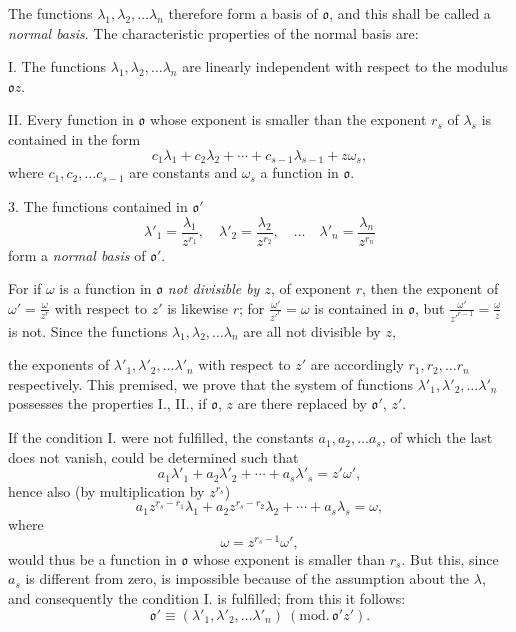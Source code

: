 \documentclass{article}
\begin{document}
The functions $\lambda_{1}, \lambda_{2}, \ldots \lambda_{n}$ therefore form a basis of $\mathfrak{o}$, and this shall be called a \emph{normal basis}. The characteristic properties of the normal basis are:

I. The functions $\lambda_{1}, \lambda_{2}, \ldots \lambda_{n}$ are linearly independent with respect to the modulus $\mathfrak{o}z$.

II. Every function in $\mathfrak{o}$ whose exponent is smaller than the exponent $r_{s}$ of $\lambda_{s}$ is contained in the form
\[ c_{1}\lambda_{1} + c_{2}\lambda_{2} + \cdots + c_{s-1}\lambda_{s-1} + z\omega_{s}, \]
where $c_{1}, c_{2}, \ldots c_{s-1}$ are constants and $\omega_{s}$ a function in $\mathfrak{o}$.

3. The functions contained in $\mathfrak{o}'$
\[ \lambda'_{1} = \frac{\lambda_{1}}{z^{r_{1}}}, \quad \lambda'_{2} = \frac{\lambda_{2}}{z^{r_{2}}}, \quad \ldots \quad \lambda'_{n} = \frac{\lambda_{n}}{z^{r_{n}}} \]
form a \emph{normal basis} of $\mathfrak{o}'$.

For if $\omega$ is a function in $\mathfrak{o}$ \emph{not divisible by $z$}, of exponent $r$, then the exponent of $\omega' = \frac{\omega}{z^{r}}$ with respect to $z'$ is likewise $r$; for $\frac{\omega'}{z'^{r}} = \omega$ is contained in $\mathfrak{o}$, but $\frac{\omega'}{z'^{r-1}} = \frac{\omega}{z}$ is not. Since the functions $\lambda_{1}, \lambda_{2}, \ldots \lambda_{n}$ are all not divisible by $z$,

the exponents of $\lambda'_{1}, \lambda'_{2}, \ldots \lambda'_{n}$ with respect to $z'$ are accordingly $r_{1}, r_{2}, \ldots r_{n}$ respectively. This premised, we prove that the system of functions $\lambda'_{1}, \lambda'_{2}, \ldots \lambda'_{n}$ possesses the properties I., II., if $\mathfrak{o}$, $z$ are there replaced by $\mathfrak{o}'$, $z'$.

If the condition I. were not fulfilled, the constants $a_{1}, a_{2}, \ldots a_{s}$, of which the last does not vanish, could be determined such that
\[ a_{1}\lambda'_{1} + a_{2}\lambda'_{2} + \cdots + a_{s}\lambda'_{s} = z'\omega', \]
hence also (by multiplication by $z^{r_{s}}$)
\[ a_{1}z^{r_{s}-r_{1}}\lambda_{1} + a_{2}z^{r_{s}-r_{2}}\lambda_{2} + \cdots + a_{s}\lambda_{s} = \omega, \]
where
\[ \omega = z^{r_{s}-1}\omega', \]
would thus be a function in $\mathfrak{o}$ whose exponent is smaller than $r_{s}$. But this, since $a_{s}$ is different from zero, is impossible because of the assumption about the $\lambda$, and consequently the condition I. is fulfilled; from this it follows:
\[ \mathfrak{o}' \equiv (\lambda'_{1}, \lambda'_{2}, \ldots \lambda'_{n})\ (\text{mod.}\,\mathfrak{o}'z'). \]
\end{document}
